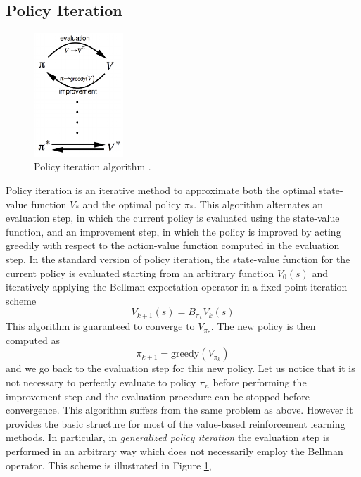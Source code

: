 \subsection{Policy Iteration}
\begin{figure}[t]
	\centering
	\includegraphics[width=0.3\textwidth]{Images/2_0_policy_iteration.png}
	\caption[Policy iteration algorithm.]{Policy iteration algorithm \cite{sutton1998introduction}.}
	\label{fig:policy_iteration}
\end{figure}
Policy iteration is an iterative method to approximate both the optimal state-value function $V_*$ and the optimal policy $\pi_*$. This algorithm alternates an evaluation step, in which the current policy is evaluated using the state-value function, and an improvement step, in which the policy is improved by acting greedily with respect to the action-value function computed in the evaluation step. In the standard version of policy iteration, the state-value function for the current policy is evaluated starting from an arbitrary function $V_0(s)$ and iteratively applying the Bellman expectation operator in a fixed-point iteration scheme 
\begin{equation*}
	V_{k+1}(s) = B_{\pi_k} V_k(s)
\end{equation*}
This algorithm is guaranteed to converge to $V_{\pi_*}$. The new policy is then computed as 
\begin{equation*}
	\pi_{k+1} = \text{greedy}(V_{\pi_k})
\end{equation*}
and we go back to the evaluation step for this new policy. Let us notice that it is not necessary to perfectly evaluate to policy $\pi_n$ before performing the improvement step and the evaluation procedure can be stopped before convergence. This algorithm suffers from the same problem as above. However it provides the basic structure for most of the value-based reinforcement learning methods. In particular, in \emph{generalized policy iteration} the evaluation step is performed in an arbitrary way which does not necessarily employ the Bellman operator. This scheme is illustrated in Figure \ref{fig:policy_iteration},

  



